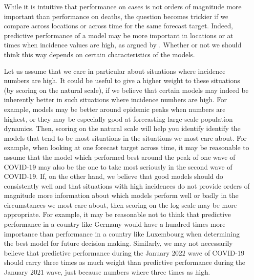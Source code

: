 \documentclass{article}
\begin{document}
While it is intuitive that performance on cases is not orders of magnitude more important than performance on deaths, the question becomes trickier if we compare across locations or across time for the same forecast target. Indeed, predictive performance of a model may be more important in locations or at times when incidence values are high, as argued by \citep{Bracher}. Whether or not we should think this way depends on certain characteristics of the models. 

Let us assume that we care in particular about situations where incidence numbers are high. It could be useful to give a higher weight to these situations (by scoring on the natural scale), if we believe that certain models may indeed be inherently better in such situations where incidence numbers are high. For example, models may be better around epidemic peaks when numbers are highest, or they may be especially good at forecasting large-scale population dynamics. %
Then, scoring on the natural scale will help you identify identify the models that tend to be most situations in the situations we most care about. For example, when looking at one forecast target across time, it may be reasonable to assume that the model which performed best around the peak of one wave of COVID-19 may also be the one to take most seriously in the second wave of COVID-19. If, on the other hand, we believe that good models should do consistently well and that situations with high incidences do not provide orders of magnitude more information about which models perform well or badly in the circumstances we most care about, then scoring on the log scale may be more appropriate. For example, it may be reasonable not to think that predictive performance in a country like Germany would have a hundred times more importance than performance in a country like Luxembourg when determining the best model for future decision making. Similarly, we may not necessarily believe that predictive performance during the January 2022 wave of COVID-19 should carry three times as much weight than predictive performance during the January 2021 wave, just because numbers where three times as high. 
\end{document}
